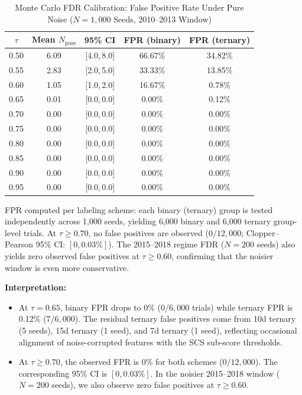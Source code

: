 \documentclass[12pt,a4paper]{article}
\begin{document}
\begin{table}[H]
\centering
\caption{Monte Carlo FDR Calibration: False Positive Rate Under Pure Noise ($N=1{,}000$ Seeds, 2010--2013 Window)}
\label{tab:fdr}
\small
\begin{tabular}{ccccc}
\toprule
$\tau$ & Mean $N_{\text{pass}}$ & 95\% CI & FPR (binary) & FPR (ternary) \\
\midrule
0.50 & 6.09 & [4.0,\,8.0] & 66.67\% & 34.82\% \\
0.55 & 2.83 & [2.0,\,5.0] & 33.33\% & 13.85\% \\
0.60 & 1.05 & [1.0,\,2.0] & 16.67\% &  0.78\% \\
0.65 & 0.01 & [0.0,\,0.0] &  0.00\% &  0.12\% \\
0.70 & 0.00 & [0.0,\,0.0] &  0.00\% &  0.00\% \\
0.75 & 0.00 & [0.0,\,0.0] &  0.00\% &  0.00\% \\
0.80 & 0.00 & [0.0,\,0.0] &  0.00\% &  0.00\% \\
0.85 & 0.00 & [0.0,\,0.0] &  0.00\% &  0.00\% \\
0.90 & 0.00 & [0.0,\,0.0] &  0.00\% &  0.00\% \\
0.95 & 0.00 & [0.0,\,0.0] &  0.00\% &  0.00\% \\
\bottomrule
\end{tabular}
\smallskip

\footnotesize{FPR computed per labeling scheme: each binary (ternary) group is tested independently across 1{,}000 seeds, yielding 6{,}000 binary and 6{,}000 ternary group-level trials. At $\tau \geq 0.70$, no false positives are observed ($0/12{,}000$; Clopper--Pearson 95\% CI: $[0, 0.03\%]$). The 2015--2018 regime FDR ($N=200$ seeds) also yields zero observed false positives at $\tau \geq 0.60$, confirming that the noisier window is even more conservative.}
\end{table}

\textbf{Interpretation:}

\begin{itemize}
  \item At $\tau=0.65$, binary FPR drops to 0\% ($0/6{,}000$ trials) while ternary FPR is 0.12\% ($7/6{,}000$). The residual ternary false positives come from 10d ternary (5 seeds), 15d ternary (1 seed), and 7d ternary (1 seed), reflecting occasional alignment of noise-corrupted features with the SCS sub-score thresholds.

  \item At $\tau \geq 0.70$, the observed FPR is 0\% for both schemes ($0/12{,}000$). The corresponding 95\% CI is $[0, 0.03\%]$. In the noisier 2015--2018 window ($N=200$ seeds), we also observe zero false positives at $\tau \geq 0.60$.
\end{itemize}
\end{document}
